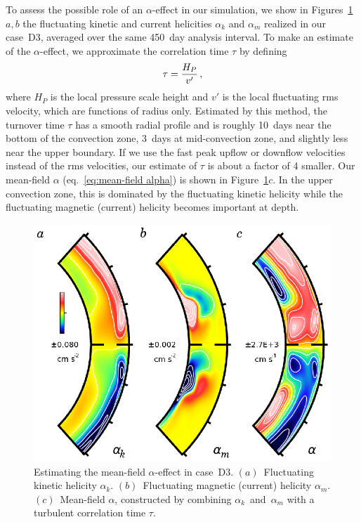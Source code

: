 To assess the possible role of an $\alpha$-effect in our
simulation, we show in Figures~\ref{fig:mean_field_alpha}$a,b$ the
fluctuating kinetic and current helicities $\alpha_k$ and $\alpha_m$ 
realized in our case~D3, averaged over the same 450~day analysis
interval. To make an estimate of the $\alpha$-effect,
we approximate the correlation time $\tau$ by defining
\begin{equation}
  \tau = \frac{H_P}{v'}\thinspace,
\end{equation}
where $H_P$ is the local pressure scale height and $v'$ is the local
fluctuating rms velocity, which are functions of radius only.  
Estimated by this method, the turnover time $\tau$ has a smooth radial
profile and is roughly 10~days near the bottom of the convection zone,
3~days at mid-convection zone, and slightly less near the upper boundary.
If we use the fast peak upflow or downflow velocities instead of the
rms velocities, our estimate of $\tau$ is about a factor of 4 smaller.
Our mean-field $\alpha$ (eq.~\ref{eq:mean-field alpha})
is shown in Figure~\ref{fig:mean_field_alpha}$c$.   In the upper convection zone, this is
dominated by the fluctuating kinetic helicity while the fluctuating
magnetic (current) helicity becomes important at depth.

\begin{figure}[!t]
  \begin{center}
    \includegraphics[width=0.7\linewidth]{figs/chapter_7/Figure_15/Figure_15.eps}
  \end{center}
  \vskip-0.25cm
  \caption[Estimating the mean-field $\alpha$-effect in case~D3]
          {Estimating the mean-field $\alpha$-effect in case~D3.  
    $(a)$~Fluctuating kinetic helicity $\alpha_k$. 
    $(b)$~Fluctuating magnetic (current) helicity $\alpha_m$. 
    $(c)$~Mean-field $\alpha$, constructed by combining
    $\alpha_k$~and~$\alpha_m$ with a turbulent correlation time $\tau$.
  \label{fig:mean_field_alpha}}
  \vskip-0.5cm
\end{figure}

